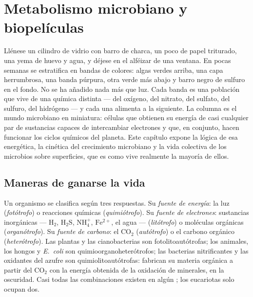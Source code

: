 \chapter{Metabolismo microbiano y biopelículas}\label{ch:b2:microbial-metabolism}

Llénese un cilindro de vidrio con barro de charca, un poco de papel
triturado, una yema de huevo y agua, y déjese en el alféizar de una
ventana. En pocas semanas se estratifica en bandas de colores: algas
verdes arriba, una capa herrumbrosa, una banda púrpura, otra verde más
abajo y barro negro de sulfuro en el fondo. No se ha añadido nada más que
luz. Cada banda es una población que vive de una química distinta --- del
oxígeno, del nitrato, del sulfato, del sulfuro, del hidrógeno --- y cada
una alimenta a la siguiente. La columna es el mundo microbiano en
miniatura: células que obtienen su energía de casi cualquier par de
sustancias capaces de intercambiar electrones y que, en conjunto, hacen
funcionar los ciclos químicos del planeta. Este capítulo expone la lógica
de esa energética, la cinética del crecimiento microbiano y la vida
colectiva de los microbios sobre superficies, que es como vive realmente
la mayoría de ellos.

\section{Maneras de ganarse la vida}

\begin{definition}\label{def:b2:microbial-metabolism:trophic}
Un organismo se clasifica según tres respuestas. Su \emph{fuente de energía}:
la luz (\emph{fotótrofo}) o reacciones químicas (\emph{quimiótrofo}).
Su \emph{fuente de electrones}: sustancias inorgánicas --- $\mathrm{H_2}$,
$\mathrm{H_2S}$, $\mathrm{NH_4^+}$, $\mathrm{Fe^{2+}}$, el agua ---
(\emph{litótrofo}) o moléculas orgánicas (\emph{organótrofo}). Su
\emph{fuente de carbono}: el $\mathrm{CO_2}$ (\emph{autótrofo}) o el
carbono orgánico (\emph{heterótrofo}). Las plantas y las cianobacterias
son fotolitoautótrofas; los animales, los hongos y \emph{E.~coli} son
quimioorganoheterótrofos; las bacterias nitrificantes y las oxidantes
del azufre son quimiolitoautótrofas: fabrican su materia orgánica a
partir del $\mathrm{CO_2}$ con la energía obtenida de la oxidación de
minerales, en la oscuridad. Casi todas las combinaciones existen en algún
; los eucariotas solo ocupan dos.
\end{definition}

